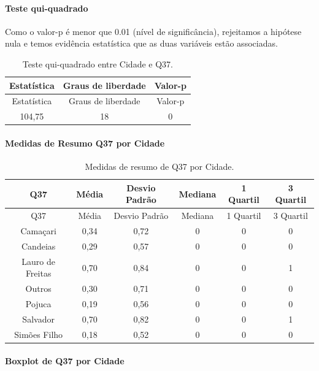 \documentclass[]{article}
\let\oldparagraph\paragraph
\renewcommand{\paragraph}[1]{\oldparagraph{#1}\mbox{}}
\begin{document}
\hypertarget{teste-qui-quadrado-117}{%
\paragraph{Teste qui-quadrado}\label{teste-qui-quadrado-117}}

Como o valor-p é menor que 0.01 (nível de significância), rejeitamos a hipótese nula e temos evidência estatística que as duas variáveis estão associadas.

\begin{longtable}[]{@{}ccc@{}}
\caption{\label{tab:unnamed-chunk-1372}Teste qui-quadrado entre Cidade e Q37.}\tabularnewline
\toprule
Estatística & Graus de liberdade & Valor-p\tabularnewline
\midrule
\endfirsthead
\toprule
Estatística & Graus de liberdade & Valor-p\tabularnewline
\midrule
\endhead
104,75 & 18 & 0\tabularnewline
\bottomrule
\end{longtable}

\cleardoublepage

\hypertarget{medidas-de-resumo-q37-por-cidade}{%
\paragraph{Medidas de Resumo Q37 por Cidade}\label{medidas-de-resumo-q37-por-cidade}}

\begin{longtable}[]{@{}cccccc@{}}
\caption{\label{tab:unnamed-chunk-1373}Medidas de resumo de Q37 por Cidade.}\tabularnewline
\toprule
Q37 & Média & Desvio Padrão & Mediana & 1 Quartil & 3 Quartil\tabularnewline
\midrule
\endfirsthead
\toprule
Q37 & Média & Desvio Padrão & Mediana & 1 Quartil & 3 Quartil\tabularnewline
\midrule
\endhead
Camaçari & 0,34 & 0,72 & 0 & 0 & 0\tabularnewline
Candeias & 0,29 & 0,57 & 0 & 0 & 0\tabularnewline
Lauro de Freitas & 0,70 & 0,84 & 0 & 0 & 1\tabularnewline
Outros & 0,30 & 0,71 & 0 & 0 & 0\tabularnewline
Pojuca & 0,19 & 0,56 & 0 & 0 & 0\tabularnewline
Salvador & 0,70 & 0,82 & 0 & 0 & 1\tabularnewline
Simões Filho & 0,18 & 0,52 & 0 & 0 & 0\tabularnewline
\bottomrule
\end{longtable}

\hypertarget{boxplot-de-q37-por-cidade}{%
\paragraph{Boxplot de Q37 por Cidade}\label{boxplot-de-q37-por-cidade}}
\end{document}
